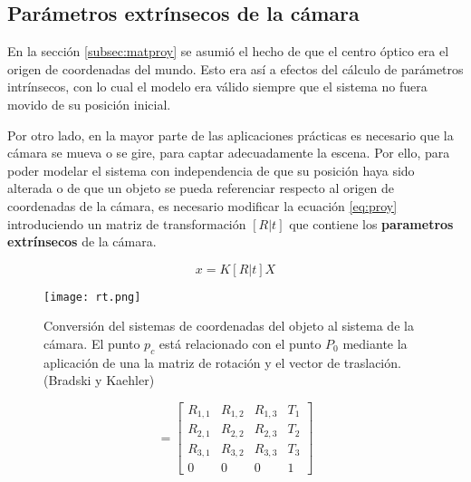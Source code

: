 \subsection{Parámetros extrínsecos de la cámara}
En la sección \ref{subsec:matproy} se asumió el hecho de que el centro óptico era el origen de coordenadas del mundo. Esto era así a efectos del cálculo de parámetros intrínsecos, con lo cual el modelo era válido siempre que el sistema no fuera movido de su posición inicial.

Por otro lado, en la mayor parte de las aplicaciones prácticas es necesario que la cámara se mueva o se gire, para captar adecuadamente la escena. Por ello, para poder modelar el sistema con independencia de que su posición haya sido alterada o de que un objeto se pueda referenciar respecto al origen de coordenadas de la cámara, es necesario modificar la ecuación \ref{eq:proy} introduciendo un matriz de transformación $[R|t]$ que contiene los \textbf{parametros extrínsecos} de la cámara. 

\begin{equation}
x = K [R|t] X  
\end{equation}

\begin{figure}[h!]
  \centering
  \texttt{[image: rt.png]}
  \caption{Conversión del sistemas de coordenadas del objeto al sistema de la cámara. El punto $p_c$
    está relacionado con el punto $P_0$ mediante la aplicación de una la matriz de rotación y el
    vector de traslación. (Bradski y Kaehler)}
  \label{fig:RT}
\end{figure}

\begin{equation}
  [R|t] = 
  \begin{bmatrix} 
    R_{1,1} & R_{1,2} & R_{1,3} & T_{1}  \\
    R_{2,1} & R_{2,2} & R_{2,3} & T_{2}  \\
    R_{3,1} & R_{3,2} & R_{3,3} & T_{3}  \\
    0      &   0    &   0   &  1
  \end{bmatrix}
\end{equation}

